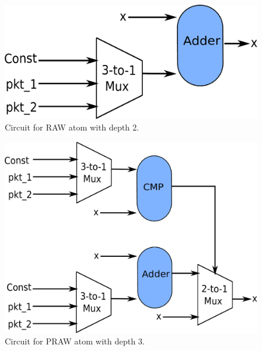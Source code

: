 \FloatBarrier

\begin{figure}[!htbp]
  \includegraphics[width=\columnwidth]{raw.pdf}
  \caption{Circuit for RAW atom with depth 2.}
  \label{fig:raw}
\end{figure}

\FloatBarrier

\begin{figure}[!htbp]
  \includegraphics[width=\columnwidth]{pred_raw.pdf}
  \caption{Circuit for PRAW atom with depth 3.}
  \label{fig:praw}
\end{figure}

\FloatBarrier

